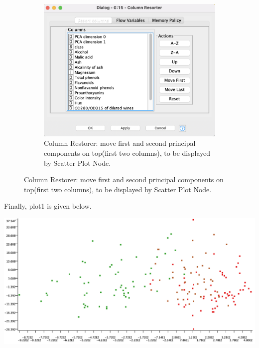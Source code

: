 \documentclass[11pt]{article}
\begin{document}
\begin{figure}[H]
\begin{subfigure}{0.4\textwidth}
					\includegraphics[width=\textwidth]{res/t1/t11/t11-column-resorter-conf}
					\caption{Column Restorer: move first and second principal components on top(first two columns), to be displayed by Scatter Plot Node.}
					\label{fig:second}
				\end{subfigure}
				\hfill
			\end{figure}
			\fi
			Finally, plot1 is given below.
			\iftrue
			\begin{center}
				\includegraphics[scale=0.5]{res/t1/t11/t11-plot1}
			\end{center}
			\fi
\end{document}
